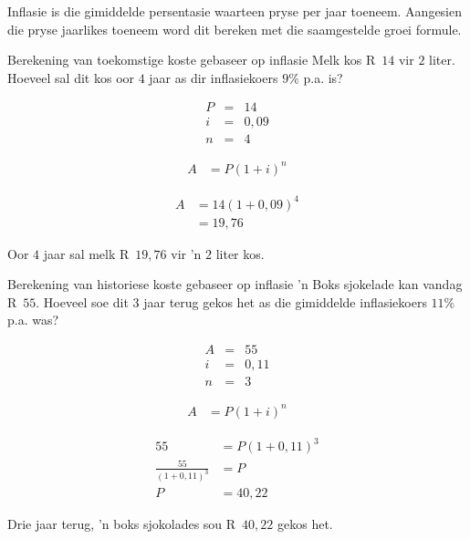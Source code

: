 Inflasie is die gimiddelde persentasie waarteen pryse per jaar toeneem. Aangesien die pryse jaarlikes toeneem word dit bereken met die saamgestelde groei formule.\par




\begin{wex}{Berekening van toekomstige koste gebaseer op inflasie}
    {Melk kos R~$14$ vir $2$ liter. Hoeveel sal dit kos oor $4$ jaar as dir inflasiekoers $9\%$ p.a. is?}{
    
    \begin{eqnarray*}
	P &=& 14\\
	i &=& 0,09\\
	n &=& 4
    \end{eqnarray*}

    \begin{align*}
	A &= P(1 + i)^n
    \end{align*}

    \begin{align*}
	A &= 14(1 + 0,09)^4\\
	  &= 19,76
    \end{align*}

    Oor $4$ jaar sal melk R~$19,76$ vir 'n $2$ liter kos.
    }
\end{wex}


\begin{wex}{Berekening van historiese koste gebaseer op inflasie}
    {'n Boks sjokelade kan vandag R~$55$. Hoeveel soe dit $3$ jaar terug gekos het as die gimiddelde inflasiekoers $11\%$ p.a. was?}
{
    \begin{eqnarray*}
	A &=& 55\\
	i &=& 0,11\\
	n &=& 3
    \end{eqnarray*}

    \begin{align*}
	A &= P(1 + i)^n
    \end{align*}

    \begin{align*}
	55 &= P(1 + 0,11)^3\\
	\frac{55}{(1 + 0,11)^3} &= P\\
	P  &= 40,22
    \end{align*}

    Drie jaar terug, 'n boks sjokolades sou R~$40,22$ gekos het.
    }
\end{wex}


